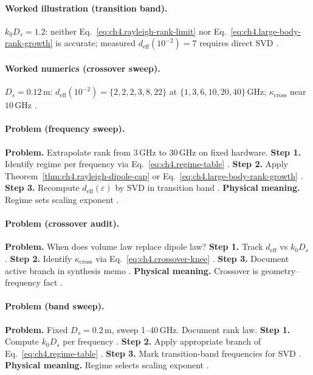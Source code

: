 \paragraph{Worked illustration (transition band).}
\(k_{0}D_{s}=1.2\): neither Eq.~\eqref{eq:ch4.rayleigh-rank-limit} nor Eq.~\eqref{eq:ch4.large-body-rank-growth} is accurate; measured
\(d_{\mathrm{eff}}(10^{-2})=7\) requires direct SVD \cite{hansen1988,harrington2001,devaney2004}.

\paragraph{Worked numerics (crossover sweep).}
\(D_{s}=0.12\,\mathrm{m}\): \(d_{\mathrm{eff}}(10^{-2})=\{2,2,2,3,8,22\}\) at \(\{1,3,6,10,20,40\}\,\mathrm{GHz}\); \(\kappa_{\mathrm{cross}}\) near
\(10\,\mathrm{GHz}\) \cite{jackson1999,harrington2001,hansen1988,collin2001}.

\paragraph{Problem (frequency sweep).}
\textbf{Problem.} Extrapolate rank from 3\,GHz to 30\,GHz on fixed hardware.
\textbf{Step 1.} Identify regime per frequency via Eq.~\eqref{eq:ch4.regime-table} \cite{jackson1999,stratton1941}.
\textbf{Step 2.} Apply Theorem~\ref{thm:ch4.rayleigh-dipole-cap} or Eq.~\eqref{eq:ch4.large-body-rank-growth} \cite{hansen1988,harrington2001}.
\textbf{Step 3.} Recompute \(d_{\mathrm{eff}}(\varepsilon)\) by SVD in transition band \cite{devaney2004}.
\textbf{Physical meaning.} Regime sets scaling exponent \cite{stratton1941}.

\paragraph{Problem (crossover audit).}
\textbf{Problem.} When does volume law replace dipole law?
\textbf{Step 1.} Track \(d_{\mathrm{eff}}\) vs \(k_{0}D_{s}\) \cite{hansen1988}.
\textbf{Step 2.} Identify \(\kappa_{\mathrm{cross}}\) via Eq.~\eqref{eq:ch4.crossover-knee} \cite{jackson1999}.
\textbf{Step 3.} Document active branch in synthesis memo \cite{stratton1941,harrington2001}.
\textbf{Physical meaning.} Crossover is geometry--frequency fact \cite{hansen1988}.

\paragraph{Problem (band sweep).}
\textbf{Problem.} Fixed \(D_{s}=0.2\,\mathrm{m}\), sweep 1--40\,GHz. Document rank law.
\textbf{Step 1.} Compute \(k_{0}D_{s}\) per frequency \cite{jackson1999}.
\textbf{Step 2.} Apply appropriate branch of Eq.~\eqref{eq:ch4.regime-table} \cite{stratton1941,hansen1988}.
\textbf{Step 3.} Mark transition-band frequencies for SVD \cite{harrington2001,devaney2004}.
\textbf{Physical meaning.} Regime selects scaling exponent \cite{devaney2004}.

